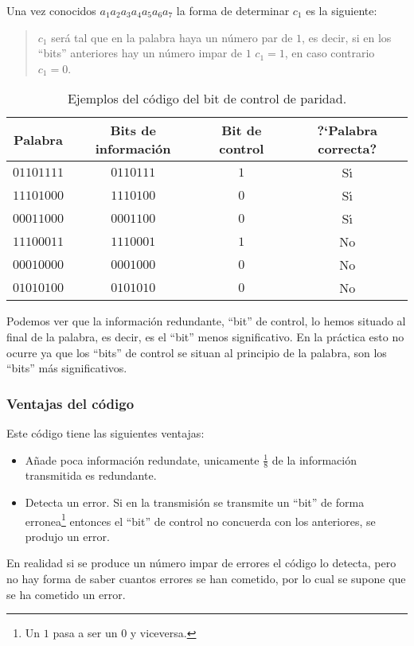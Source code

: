 Una vez conocidos $a_1a_2a_3a_4a_5a_6a_7$ la forma de determinar $c_1$ es la 
siguiente:
\begin{quote}
$c_1$ ser\'a tal que en la palabra haya un n\'umero par de $1$, es decir, si
en los ``bits'' anteriores hay un n\'umero impar de $1$ $c_1=1$, en caso
contrario $c_1=0$.
\end{quote}
\begin{table}[!h]
\begin{center}
\begin{tabular}{|c|c|c|c|}
\hline
Palabra & Bits de informaci\'on & Bit de control & ?`Palabra correcta?\\
\hline
$01101111$ & $0110111$ & $1$ & S\'{\i} \\
\hline
$11101000$ & $1110100$ & $0$ & S\'{\i} \\
\hline
$00011000$ & $0001100$ & $0$ & S\'{\i} \\
\hline
$11100011$ & $1110001$ & $1$ & No \\
\hline 
$00010000$ & $0001000$ & $0$ & No \\
\hline
$01010100$ & $0101010$ & $0$ & No \\
\hline
\end{tabular}
\end{center}
\caption{Ejemplos del c\'odigo del bit de control de paridad.}
\end{table}

Podemos ver que la informaci\'on redundante, ``bit'' de control, lo hemos
situado al final de la palabra, es decir, es el ``bit'' menos significativo. En
la pr\'actica esto no ocurre ya que los ``bits'' de control se situan al 
principio de la palabra, son los ``bits'' m\'as significativos.

\subsubsection{Ventajas del c\'odigo}

Este c\'odigo tiene las siguientes ventajas:
\begin{itemize}
\item A\~nade poca informaci\'on redundate, unicamente $\frac{1}{8}$ de la
informaci\'on transmitida es redundante.
\item Detecta un error. Si en la transmisi\'on se transmite un ``bit'' de
forma erronea\footnote{Un $1$ pasa a ser un $0$ y viceversa.} entonces el
``bit'' de control no concuerda con los anteriores, se produjo un error.
\end{itemize}
En realidad si se produce un n\'umero impar de errores el c\'odigo lo detecta,
pero no hay forma de saber cuantos errores se han cometido, por lo cual se 
supone que se ha cometido un error.


